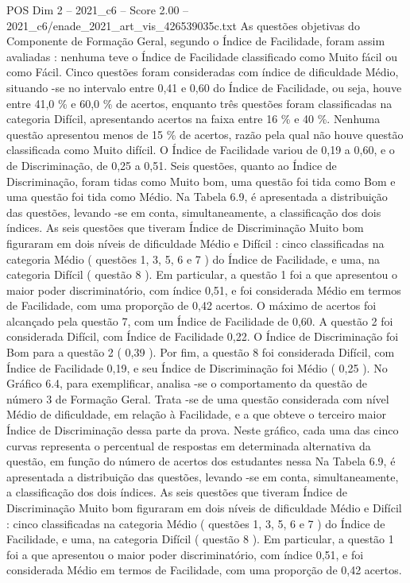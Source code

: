 \begin{textsample}{POS Dim 2 – 2021\_c6 – Score 2.00 – 2021\_c6/enade\_2021\_art\_vis\_426539035c.txt}
As questões objetivas do Componente de Formação Geral, segundo o Índice de Facilidade, foram assim avaliadas : nenhuma teve o Índice de Facilidade classificado como Muito fácil ou como Fácil.
Cinco questões foram consideradas com índice de dificuldade Médio, situando -se no intervalo entre 0,41 e 0,60 do Índice de Facilidade, ou seja, houve entre 41,0 \% e 60,0 \% de acertos, enquanto três questões foram classificadas na categoria Difícil, apresentando acertos na faixa entre 16 \% e 40 \%.
Nenhuma questão apresentou menos de 15 \% de acertos, razão pela qual não houve questão classificada como Muito difícil.
O Índice de Facilidade variou de 0,19 a 0,60, e o de Discriminação, de 0,25 a 0,51.
Seis questões, quanto ao Índice de Discriminação, foram tidas como Muito bom, uma questão foi tida como Bom e uma questão foi tida como Médio.
Na Tabela 6.9, é apresentada a distribuição das questões, levando -se em conta, simultaneamente, a classificação dos dois índices.
As seis questões que tiveram Índice de Discriminação Muito bom figuraram em dois níveis de dificuldade Médio e Difícil : cinco classificadas na categoria Médio ( questões 1, 3, 5, 6 e 7 ) do Índice de Facilidade, e uma, na categoria Difícil ( questão 8 ).
Em particular, a questão 1 foi a que apresentou o maior poder discriminatório, com índice 0,51, e foi considerada Médio em termos de Facilidade, com uma proporção de 0,42 acertos.
O máximo de acertos foi alcançado pela questão 7, com um Índice de Facilidade de 0,60.
A questão 2 foi considerada Difícil, com Índice de Facilidade 0,22.
O Índice de Discriminação foi Bom para a questão 2 ( 0,39 ).
Por fim, a questão 8 foi considerada Difícil, com Índice de Facilidade 0,19, e seu Índice de Discriminação foi Médio ( 0,25 ).
No Gráfico 6.4, para exemplificar, analisa -se o comportamento da questão de número 3 de Formação Geral.
Trata -se de uma questão considerada com nível Médio de dificuldade, em relação à Facilidade, e a que obteve o terceiro maior Índice de Discriminação dessa parte da prova.
Neste gráfico, cada uma das cinco curvas representa o percentual de respostas em determinada alternativa da questão, em função do número de acertos dos estudantes nessa Na Tabela 6.9, é apresentada a distribuição das questões, levando -se em conta, simultaneamente, a classificação dos dois índices.
As seis questões que tiveram Índice de Discriminação Muito bom figuraram em dois níveis de dificuldade Médio e Difícil : cinco classificadas na categoria Médio ( questões 1, 3, 5, 6 e 7 ) do Índice de Facilidade, e uma, na categoria Difícil ( questão 8 ).
Em particular, a questão 1 foi a que apresentou o maior poder discriminatório, com índice 0,51, e foi considerada Médio em termos de Facilidade, com uma proporção de 0,42 acertos.

\end{textsample}
